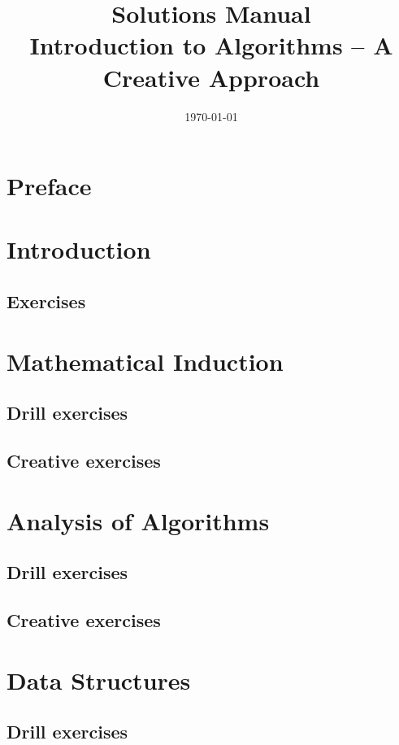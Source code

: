 \documentclass[a4paper,11pt]{memoir}
\title{{\huge \textbf{Solutions Manual}}\\Introduction to Algorithms -- A Creative
Approach}
\author{}
\date{\today}
\begin{document}
    \frontmatter 
   
    \maketitle
    \chapter{Preface}

    \newpage 
    \tableofcontents

    \mainmatter
    \chapter{Introduction}
    \section{Exercises}

    \chapter{Mathematical Induction}
    \section{Drill exercises}
    \section{Creative exercises}

    \chapter{Analysis of Algorithms}
    \section{Drill exercises}
    \section{Creative exercises}
    
    \chapter{Data Structures}
    \section{Drill exercises}
\end{document}
